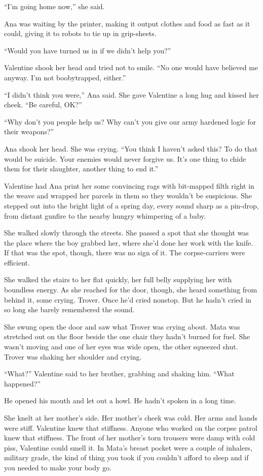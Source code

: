 “I’m going home now,” she said.

Ana was waiting by the printer, making it output clothes and food
as fast as it could, giving it to robots to tie up in grip-sheets.

“Would you have turned us in if we didn’t help you?”

Valentine shook her head and tried not to smile. “No one would have
believed me anyway. I’m not boobytrapped, either.”

“I didn’t think you were,” Ana said. She gave Valentine a long hug
and kissed her cheek. “Be careful, OK?”

“Why don’t you people help us? Why can’t you give our army hardened
logic for their weapons?”

Ana shook her head. She was crying. “You think I haven’t asked
this? To do that would be suicide. Your enemies would never forgive
us. It’s one thing to chide them for their slaughter, another thing
to end it.”

Valentine had Ana print her some convincing rags with bit-mapped
filth right in the weave and wrapped her parcels in them so they
wouldn’t be suspicious. She stepped out into the bright light of a
spring day, every sound sharp as a pin-drop, from distant gunfire
to the nearby hungry whimpering of a baby.

She walked slowly through the streets. She passed a spot that she
thought was the place where the boy grabbed her, where she’d done
her work with the knife. If that was the spot, though, there was no
sign of it. The corpse-carriers were efficient.

She walked the stairs to her flat quickly, her full belly supplying
her with boundless energy. As she reached for the door, though, she
heard something from behind it, some crying. Trover. Once he’d
cried nonstop. But he hadn’t cried in so long she barely remembered
the sound.

She swung open the door and saw what Trover was crying about. Mata
was stretched out on the floor beside the one chair they hadn’t
burned for fuel. She wasn’t moving and one of her eyes was wide
open, the other squeezed shut. Trover was shaking her shoulder and
crying.

“What?” Valentine said to her brother, grabbing and shaking him.
“What happened?”

He opened his mouth and let out a howl. He hadn’t spoken in a long
time.

She knelt at her mother’s side. Her mother’s cheek was cold. Her
arms and hands were stiff. Valentine knew that stiffness. Anyone
who worked on the corpse patrol knew that stiffness. The front of
her mother’s torn trousers were damp with cold piss, Valentine
could smell it. In Mata’s breast pocket were a couple of inhalers,
military grade, the kind of thing you took if you couldn’t afford
to sleep and if you needed to make your body go.

